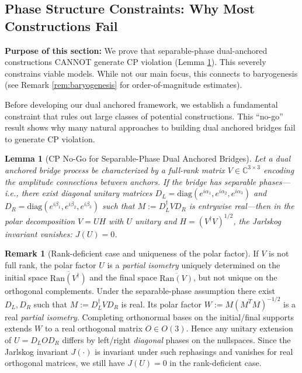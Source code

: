 \documentclass[11pt]{article}
\theoremstyle{plain}
\newtheorem{lemma}[theorem]{Lemma}
\theoremstyle{definition}
\newtheorem{remark}[theorem]{Remark}
\begin{document}
\subsection{Phase Structure Constraints: Why Most Constructions Fail}

\textbf{Purpose of this section:} We prove that separable-phase dual-anchored
constructions CANNOT generate CP violation (Lemma \ref{lem:cp-nogo}). This
severely constrains viable models. While not our main focus, this connects
to baryogenesis (see Remark \ref{rem:baryogenesis} for order-of-magnitude
estimates).

Before developing our dual anchored framework, we establish a fundamental constraint that rules out large classes of potential constructions. This ``no-go'' result shows why many natural approaches to building dual anchored bridges fail to generate CP violation.

\begin{lemma}[CP No-Go for Separable-Phase Dual Anchored Bridges]\label{lem:cp-nogo}
  Let a dual anchored bridge process be characterized by a \emph{full-rank} matrix $V \in \mathbb{C}^{3\times 3}$ encoding the amplitude connections between anchors. If the bridge has separable phases—i.e., there exist diagonal unitary matrices $D_L=\mathrm{diag}(e^{i\alpha_1},e^{i\alpha_2},e^{i\alpha_3})$ and $D_R=\mathrm{diag}(e^{i\beta_1},e^{i\beta_2},e^{i\beta_3})$ such that $M:=D_L^\dagger V D_R$ is entrywise real—then in the polar decomposition $V=UH$ with $U$ unitary and $H=(V^\dagger V)^{1/2}$, the Jarlskog invariant vanishes: $J(U)=0$.
\end{lemma}

\begin{remark}[Rank-deficient case and uniqueness of the polar factor]
  If $V$ is not full rank, the polar factor $U$ is a \emph{partial isometry} uniquely determined on the initial space $\overline{\mathrm{Ran}(V^\dagger)}$ and the final space $\overline{\mathrm{Ran}(V)}$, but not unique on the orthogonal complements. Under the separable-phase assumption there exist $D_L,D_R$ such that $M:=D_L^\dagger V D_R$ is real. Its polar factor $W:=M(M^T M)^{-1/2}$ is a real \emph{partial isometry}. Completing orthonormal bases on the initial/final supports extends $W$ to a real orthogonal matrix $O\in O(3)$. Hence any unitary extension of $U=D_L O D_R$ differs by left/right \emph{diagonal} phases on the nullspaces. Since the Jarlskog invariant $J(\cdot)$ is invariant under such rephasings and vanishes for real orthogonal matrices, we still have $J(U)=0$ in the rank-deficient case.
\end{remark}
\end{document}
